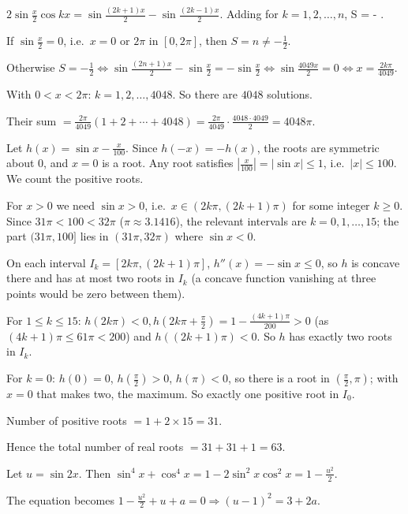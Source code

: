   $2\sin\frac{x}{2}\cos kx = \sin\frac{(2k + 1)x}{2} - \sin\frac{(2k - 1)x}{2}$. Adding for $k = 1, 2, \ldots, n$,
  \sin{}S = \sin{} - \sin{}.
  \stopformula

  If $\sin\frac{x}{2} = 0$, i.e.\ $x = 0$ or $2\pi$ in $[0, 2\pi]$, then $S = n\neq -\frac{1}{2}$.

  Otherwise $S = -\frac{1}{2}\Leftrightarrow\sin\frac{(2n + 1)x}{2} - \sin\frac{x}{2} = -\sin\frac{x}{2}
  \Leftrightarrow\sin\frac{4049x}{2} = 0\Leftrightarrow x = \frac{2k\pi}{4049}$.

  With $0 < x < 2\pi$: $k = 1, 2, \ldots, 4048$. So there are $4048$ solutions.

  Their sum $= \frac{2\pi}{4049}(1 + 2 + \cdots + 4048) = \frac{2\pi}{4049}\cdot\frac{4048\cdot4049}{2} =
  4048\pi$.
\item Let $h(x) = \sin x - \frac{x}{100}$. Since $h(-x) = -h(x)$, the roots are symmetric about $0$, and $x = 0$
  is a root. Any root satisfies $\left|\frac{x}{100}\right| = |\sin x|\le 1$, i.e.\ $|x|\le 100$. We count the
  positive roots.

  For $x > 0$ we need $\sin x > 0$, i.e.\ $x\in(2k\pi, (2k + 1)\pi)$ for some integer $k\ge 0$. Since $31\pi <
  100 < 32\pi$ ($\pi\approx 3.1416$), the relevant intervals are $k = 0, 1, \ldots, 15$; the part $(31\pi, 100]$
  lies in $(31\pi, 32\pi)$ where $\sin x < 0$.

  On each interval $I_k = [2k\pi, (2k + 1)\pi]$, $h''(x) = -\sin x\le 0$, so $h$ is concave there and has at most
  two roots in $I_k$ (a concave function vanishing at three points would be zero between them).

  For $1\le k\le 15$: $h(2k\pi) < 0, h\left(2k\pi + \frac{\pi}{2}\right) = 1 - \frac{(4k + 1)\pi}{200} > 0$ (as
  $(4k + 1)\pi\le 61\pi < 200$) and $h((2k + 1)\pi) < 0$. So $h$ has exactly two roots in $I_k$.

  For $k = 0$: $h(0) = 0$, $h\left(\frac{\pi}{2}\right) > 0$, $h(\pi) < 0$, so there is a root in
  $\left(\frac{\pi}{2}, \pi\right)$; with $x = 0$ that makes two, the maximum. So exactly one positive root in
  $I_0$.

  Number of positive roots $= 1 + 2\times15 = 31$.

  Hence the total number of real roots $= 31 + 31 + 1 = 63$.
\item Let $u = \sin2x$. Then $\sin^4x + \cos^4x = 1 - 2\sin^2x\cos^2x = 1 - \frac{u^2}{2}$.

  The equation becomes $1 - \frac{u^2}{2} + u + a = 0\Rightarrow (u - 1)^2 = 3 + 2a$.

